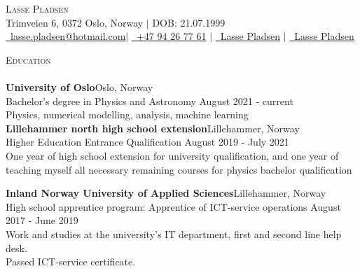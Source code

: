 \documentclass[a4paper]{article}
\newcommand{\lineunder} {
    \vspace*{-8pt} \\
    \hspace*{-18pt} \hrulefill \\
}
\newcommand{\header} [1] {
    {\hspace*{-18pt}\vspace*{6pt} \textsc{#1}}
    \vspace*{-6pt} \lineunder
}
\begin{document}
\vspace*{-40pt}

    

\vspace*{-10pt}
\begin{center}
	{\Huge \scshape {Lasse Pladsen}}\\
	Trimveien 6, 0372 Oslo, Norway $|$ DOB: 21.07.1999 \\ \href{mailto:lasse.pladsen@hotmail.com}{\raisebox{-0.05\height}\faEnvelope \ lasse.pladsen@hotmail.com}$|$ \href{tel:+000000000000}{\raisebox{-0.05\height}\faMobile \ +47 94 26 77 61} $|$ \href{https://www.linkedin.com/in/lasse-p-313b41126/}{\raisebox{-0.05\height}\faLinkedin\ Lasse Pladsen} $|$ \href{https://github.com/LassePladsen}{\raisebox{-0.05\height}\faGithub\ Lasse Pladsen} \\
\end{center}

\header{Education}
\textbf{University of Oslo}\hfill Oslo, Norway\\
Bachelor's degree in Physics and Astronomy \hfill August 2021 - current\\
Physics, numerical modelling, analysis, machine learning\\
\vspace{2mm}
\textbf{Lillehammer north high school extension}\hfill Lillehammer, Norway\\
Higher Education Entrance Qualification \hfill August 2019 - July 2021\\
One year of high school extension for university qualification,
and one year of teaching myself all necessary remaining courses
for physics bachelor qualification 

\vspace{2mm}
\textbf{Inland Norway
University of Applied Sciences}\hfill Lillehammer, Norway\\
High school apprentice program: Apprentice of ICT-service operations \hfill August 2017 - June 2019\\
Work and studies at the university's IT department, first and second line help desk.\\
Passed ICT-service certificate.

\vspace{2mm}
\end{document}
